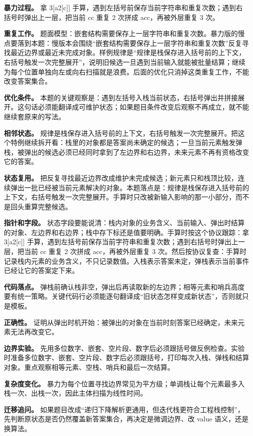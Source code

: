 \textbf{暴力过程。} 拿 3[a2[c]] 手算，遇到左括号前保存当前字符串和重复次数；遇到右括号时弹出上一层，把当前 cc 重复 2 次拼成 acc，再被外层重复 3 次。

\textbf{重复工作。} 题面模型：嵌套结构需要保存上一层字符串和重复次数。暴力版的慢点要落到本题：慢版本会围绕“嵌套结构需要保存上一层字符串和重复次数”反复寻找最近边界或最近未完成对象。样例规律是“规律是栈保存进入括号前的上下文，右括号触发一次完整展开”，说明旧候选一旦遇到当前输入就能被批量结算；继续为每个位置单独向左或向右扫描就是浪费。后面的优化只消掉这类重复工作，不能改变答案集合。

\textbf{优化条件。} 本题的关键观察是：遇到左括号入栈当前状态，右括号弹出并拼接展开。这句话必须能翻译成可维护状态；如果题目条件改变后观察不再成立，就不能继续套原来的写法。

\textbf{相邻状态。} 规律是栈保存进入括号前的上下文，右括号触发一次完整展开。把这个特例继续拆开看：栈里的对象都是答案尚未确定的候选；一旦当前元素触发弹栈，被弹出的候选必须已经同时拿到了左边界和右边界，未来元素不再有资格改变它的答案。

\textbf{状态复用。} 把反复寻找最近边界改成维护未完成候选；新元素只和栈顶比较，连续弹出一批已经被当前元素解决的对象。本题落点是：规律是栈保存进入括号前的上下文，右括号触发一次完整展开。手算时只改被新输入影响的那一小部分，而不是回头重算完整候选。

\textbf{指针和字段。} 状态字段要能说清：栈内对象的业务含义、当前输入、弹出时结算的对象、左边界和右边界；栈中存下标还是值要明确。手算时按这个协议跟踪：拿 3[a2[c]] 手算，遇到左括号前保存当前字符串和重复次数；遇到右括号时弹出上一层，把当前 cc 重复 2 次拼成 acc，再被外层重复 3 次。然后按协议复查：手算时记录栈内元素的业务含义，不只记录数值。入栈表示答案未定，弹栈表示当前事件已经让它的答案定下来。

\textbf{代码落点。} 弹栈前确认栈非空，弹出后再读取新的左边界；相等元素和哨兵高度要有统一策略。关键代码行必须能逐句翻译成“旧状态怎样变成新状态”，否则就只是模板。

\textbf{正确性。} 证明从弹出时机开始：被弹出的对象在当前时刻答案已经确定，未来元素无法再改变它。

\textbf{边界实验。} 先用多位数字、嵌套、空片段、数字后必须跟括号做反例检查。实验时准备多位数字、嵌套、空片段、数字后必须跟括号，打印每次入栈、弹栈和结算对象。重点观察相等元素、空栈、哨兵和最后一次结算。

\textbf{复杂度变化。} 暴力为每个位置寻找边界常见为平方级；单调栈让每个元素最多入栈一次、出栈一次，因此主体扫描为线性时间。

\textbf{迁移追问。} 如果题目改成“递归下降解析更通用，但迭代栈更符合工程栈控制”，先判断原状态是否仍然覆盖新答案集合，再决定是微调边界、改 value 语义，还是换算法。

